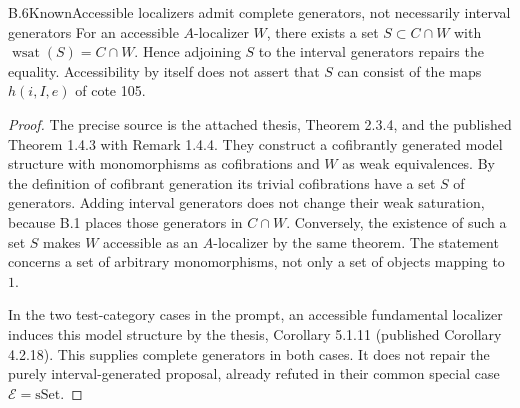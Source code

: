 \begin{claim}{B.6}{Known}{Accessible localizers admit complete generators, not necessarily interval generators}\label{B6}
For an accessible $A$-localizer $W$, there exists a set $S\subset C\cap W$
with $\operatorname{wsat}(S)=C\cap W$.  Hence adjoining $S$ to the interval
generators repairs the equality.  Accessibility by itself does not assert
that $S$ can consist of the maps $h(i,I,e)$ of cote 105.
\end{claim}
\begin{proof}
The precise source is the attached thesis, Theorem 2.3.4, and the published
Theorem 1.4.3 with Remark 1.4.4.  They construct a cofibrantly generated model
structure with monomorphisms as cofibrations and $W$ as weak equivalences.
By the definition of cofibrant generation its trivial cofibrations have a
set $S$ of generators.  Adding interval generators does not change their
weak saturation, because B.1 places those generators in $C\cap W$.
Conversely, the existence of such a set $S$ makes $W$ accessible as an
$A$-localizer by the same theorem.  The statement concerns a set of arbitrary
monomorphisms, not only a set of objects mapping to $1$.

In the two test-category cases in the prompt, an accessible fundamental
localizer induces this model structure by the thesis, Corollary 5.1.11
(published Corollary 4.2.18).  This supplies complete generators in both
cases.  It does not repair the purely interval-generated proposal, already
refuted in their common special case $\mathscr E=\mathrm{sSet}$.
\end{proof}

